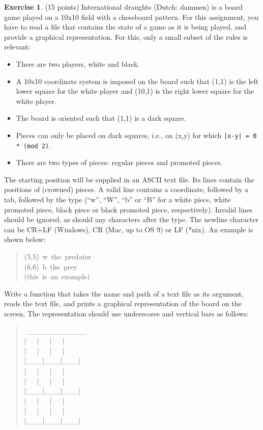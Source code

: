 \documentclass[a4paper]{report}
\theoremstyle{definition}
\newtheorem{exercise}{Exercise}
\begin{document}
\begin{exercise}
	(15 points) International draughts (Dutch: dammen) is a board game played on a 10x10 field with a chessboard pattern. For this assignment, you have to	read a file that contains the state of a game as it is being played, and provide a graphical representation. For this, only a small subset of the rules is relevant:
	\begin{itemize}
		\setlength\itemsep{1mm}
		\item There are two players, white and black.
		\item A 10x10 coordinate system is imposed on the board such that (1,1)	is the left lower square for the white player and (10,1) is the	right lower square for the white player.
		\item The board is oriented such that (1,1) is a dark square.
		\item Pieces can only be placed on dark squares, i.e., on (x,y) for which \texttt{|x-y| = 0 * (mod 2)}.
		\item There are two types of pieces: regular pieces and promoted pieces.
	\end{itemize}
	
	\noindent The starting position will be supplied in an ASCII text file.  Its lines contain the positions of (crowned) pieces. A valid line contains a coordinate, followed by a tab, followed by the type (“w”, “W”, “b” or “B” for a white piece, white promoted piece, black piece or black promoted piece, respectively). Invalid lines should be ignored, as should any characters after the type. The newline character can be 	CR+LF (Windows), CR (Mac, up to OS 9) or LF (\textquotedbl{}*\textquotedbl{}nix). An example is	shown below:
	\begin{quote}{\ttfamily \raggedright \noindent
			(5,5)~w~the~predator\\
			(6,6)~b~the~prey\\
			(this~is~an~example)
		}
	\end{quote}
	Write a function that takes the name and path of a text file as	its argument, reads the text file, and prints a graphical representation of the board on the screen. The representation should use underscores and vertical bars as follows:
	\begin{quote}{\ttfamily \raggedright \noindent
			~\_\_\_\_\_\_\_\_\_\_\_\\
			|~~~|~~~|~~~|\\
			|~~~|~~~|~~~|\\
			|\_\_\_|\_\_\_|\_\_\_|\\
			|~~~|~~~|~~~|\\
			|~~~|~~~|~~~|\\
			|\_\_\_|\_\_\_|\_\_\_|\\
			|~~~|~~~|~~~|\\
			|~~~|~~~|~~~|\\
			|\_\_\_|\_\_\_|\_\_\_|
		}
	\end{quote}
	

\end{exercise}
\end{document}
